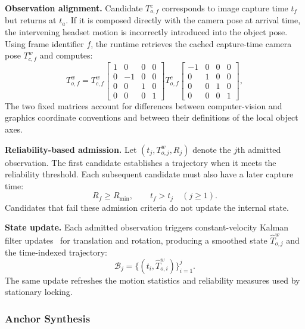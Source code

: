 \documentclass[review]{vgtc}
\begin{document}
\textbf{Observation alignment.}
Candidate $T_{o,f}^{c}$ corresponds to image capture time $t_f$ but returns at $t_a$. If it is composed directly with the camera pose at arrival time, the intervening headset motion is incorrectly introduced into the object pose. Using frame identifier $f$, the runtime retrieves the cached capture-time camera pose $T_{c,f}^{w}$ and computes:
\begin{equation}
T_{o,f}^{w} = T_{c,f}^{w}
\begin{bmatrix}
1 & 0 & 0 & 0 \\
0 & -1 & 0 & 0 \\
0 & 0 & 1 & 0 \\
0 & 0 & 0 & 1
\end{bmatrix}
T_{o,f}^{c}
\begin{bmatrix}
-1 & 0 & 0 & 0 \\
0 & 1 & 0 & 0 \\
0 & 0 & 1 & 0 \\
0 & 0 & 0 & 1
\end{bmatrix},
\label{eq:capture-alignment}
\end{equation}
The two fixed matrices account for differences between computer-vision and graphics coordinate conventions and between their definitions of the local object axes.

\textbf{Reliability-based admission.}
Let $(t_j,T_{o,j}^{w},R_j)$ denote the $j$th admitted observation. The first candidate establishes a trajectory when it meets the reliability threshold. Each subsequent candidate must also have a later capture time:
\begin{equation}
R_f \geq R_{\min}, \qquad t_f > t_j \quad (j \geq 1).
\label{eq:admission}
\end{equation}
Candidates that fail these admission criteria do not update the internal state.

\textbf{State update.}
Each admitted observation triggers constant-velocity Kalman filter updates~\cite{kalman1960new} for translation and rotation, producing a smoothed state $\widehat{T}_{o,j}^{w}$ and the time-indexed trajectory:
\begin{equation}
\mathcal{B}_j = \{(t_i, \widehat{T}_{o,i}^{w})\}_{i=1}^{j}.
\label{eq:trajectory}
\end{equation}
The same update refreshes the motion statistics and reliability measures used by stationary locking.

\subsubsection{Anchor Synthesis}\label{sec:frame-output}
\end{document}
